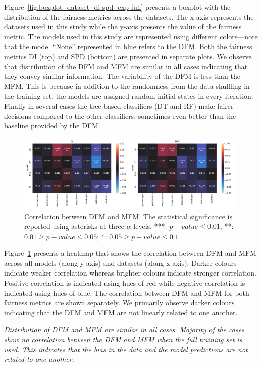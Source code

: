 \documentclass{article}
\newcommand{\highlight}[1]{\begin{framed}%
  \noindent\emph{#1}
\end{framed}}
\begin{document}
Figure \ref{fig:boxplot--dataset--di-spd--exp-full} presents a boxplot
with the distribution of the fairness metrics across the datasets. The
x-axis represents the datasets used in this study while the y-axis
presents the value of the fairness metric. The models used in this
study are represented using different colors---note that the model
``None'' represented in blue refers to the DFM. Both the fairness
metrics DI (top) and SPD (bottom) are presented in separate plots. We
observe that distribution of the DFM and MFM are similar in all cases
indicating that they convey similar information. The variability of
the DFM is less than the MFM. This is because in addition to the
randomness from the data shuffling in the training set, the models are
assigned random initial states in every iteration. Finally in several
cases the tree-based classifiers (DT and RF) make fairer decisions
compared to the other classifiers, sometimes even better than the
baseline provided by the DFM.

\begin{figure}
  \centering
  \includegraphics[width=0.95\linewidth]{heatmap--corr--full-data.pdf}
  \caption{Correlation between DFM and MFM. The statistical
  significance is reported using asterisks at three $\alpha$
  levels. ***: $p-value \le 0.01$; **: $0.01 \ge p-value \le0.05$; *:
  $0.05 \ge p-value \le 0.1$}
  \label{fig:heatmap--corr--full-data}
\end{figure}

Figure \ref{fig:heatmap--corr--full-data} presents a heatmap that
shows the correlation between DFM and MFM across all models (along
y-axis) and datasets (along x-axis). Darker colours indicate weaker
correlation whereas brighter colours indicate stronger
correlation. Positive correlation is indicated using hues of red while
negative correlation is indicated using hues of blue. The correlation
between DFM and MFM for both fairness metrics are shown separately. We
primarily observe darker colours indicating that the DFM and MFM are
not linearly related to one another.

\highlight{Distribution of DFM and MFM are similar in all
cases. Majority of the cases show no correlation between the DFM and
MFM when the full training set is used. This indicates that the bias
in the data and the model predictions are not related to one
another.}
\end{document}
